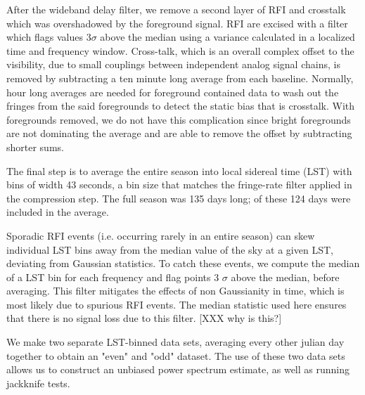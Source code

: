 \documentclass[twocolumn,numberedappendix]{emulateapj} \shorttitle{PSA64}
\begin{document}
After the wideband delay filter, we remove a second layer of RFI and crosstalk
 which was overshadowed by the foreground signal. RFI are excised with 
 a filter which flags values $3\sigma$ above the median using a variance calculated in a localized time and frequency window.  Cross-talk, which is an overall complex offset to the visibility, due to small couplings between independent analog signal chains, is removed by subtracting a ten minute long average from each baseline. Normally, hour long averages are needed for foreground contained data
to wash out the fringes from the said foregrounds to detect the static 
bias that is crosstalk. With foregrounds removed, we do not have this
complication since bright foregrounds are not dominating the average and are
able to remove the offset by subtracting shorter sums.

The final step is to average the entire season into local sidereal
time (LST) with bins of width 43 seconds, a bin size that matches the fringe-rate filter applied
in the compression step. The full season was 135 days long; of these 124 days were included in the average. 

Sporadic RFI events (i.e. occurring rarely in an entire season) can skew individual LST bins away from the median value of
the sky at a given LST, deviating from Gaussian statistics. To catch these
events, we compute the median of a LST bin for each frequency and flag points  3
$\sigma$ above the median, before averaging. This filter mitigates
the effects of non Gaussianity in time, which is most likely due to spurious
RFI events. The median statistic used here ensures that there is no signal
loss due to this filter. [XXX why is this?]

We make two separate LST-binned data sets, averaging every other julian day
together to obtain an "even" and "odd" dataset. The use of these two data sets
allows us to construct an unbiased power spectrum estimate, as well as running
jackknife tests. 
\end{document}

